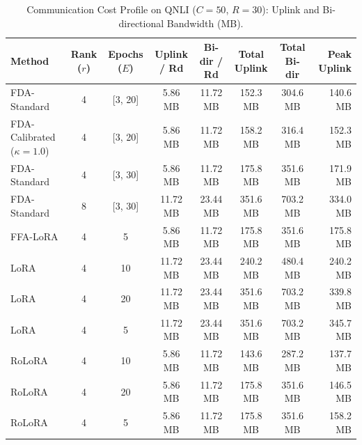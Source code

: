 \documentclass[10pt,a4paper]{article}
\begin{document}
\begin{table}[H]
\centering
\caption{Communication Cost Profile on QNLI ($C=50$, $R=30$): Uplink and Bi-directional Bandwidth (MB).}
\scriptsize
\setlength{\tabcolsep}{4.0pt}
\begin{tabular*}{\textwidth}{@{\extracolsep{\fill}}lccccccr@{}}
\toprule
\textbf{Method} & \textbf{Rank ($r$)} & \textbf{Epochs ($E$)} & \textbf{Uplink / Rd} & \textbf{Bi-dir / Rd} & \textbf{Total Uplink} & \textbf{Total Bi-dir} & \textbf{Peak Uplink} \\
\midrule
FDA-Standard & 4 & [3, 20] & 5.86 MB & 11.72 MB & 152.3 MB & 304.6 MB & 140.6 MB \\
FDA-Calibrated ($\kappa=1.0$) & 4 & [3, 20] & 5.86 MB & 11.72 MB & 158.2 MB & 316.4 MB & 152.3 MB \\
FDA-Standard & 4 & [3, 30] & 5.86 MB & 11.72 MB & 175.8 MB & 351.6 MB & 171.9 MB \\
FDA-Standard & 8 & [3, 30] & 11.72 MB & 23.44 MB & 351.6 MB & 703.2 MB & 334.0 MB \\
FFA-LoRA & 4 & 5 & 5.86 MB & 11.72 MB & 175.8 MB & 351.6 MB & 175.8 MB \\
LoRA & 4 & 10 & 11.72 MB & 23.44 MB & 240.2 MB & 480.4 MB & 240.2 MB \\
LoRA & 4 & 20 & 11.72 MB & 23.44 MB & 351.6 MB & 703.2 MB & 339.8 MB \\
LoRA & 4 & 5 & 11.72 MB & 23.44 MB & 351.6 MB & 703.2 MB & 345.7 MB \\
RoLoRA & 4 & 10 & 5.86 MB & 11.72 MB & 143.6 MB & 287.2 MB & 137.7 MB \\
RoLoRA & 4 & 20 & 5.86 MB & 11.72 MB & 175.8 MB & 351.6 MB & 146.5 MB \\
RoLoRA & 4 & 5 & 5.86 MB & 11.72 MB & 175.8 MB & 351.6 MB & 158.2 MB \\
\bottomrule
\end{tabular*}
\end{table}
\end{document}
